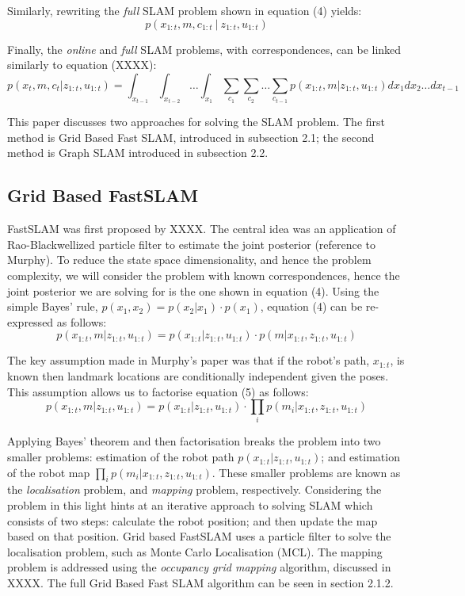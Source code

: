 \documentclass[a4paper]{article}
\begin{document}
Similarly, rewriting the \textit{full} SLAM problem shown in equation (4) yields:
\begin{equation}
p(x_{1:t}, m, c_{1:t} \ | \ z_{1:t}, u_{1:t})
\end{equation}

Finally, the \textit{online} and \textit{full} SLAM problems, with correspondences, can be linked similarly to equation (XXXX):
\begin{equation}
p(x_t, m, c_t | z_{1:t}, u_{1:t}) = \int_{x_{t-1}} \int_{x_{t-2}} \dots \int_{x_1} \sum_{c_1} \sum_{c_2} \dots \sum_{c_{t-1}} p(x_{1:t}, m | z_{1:t}, u_{1:t}) dx_1 dx_2 \dots dx_{t-1}
\end{equation}

This paper discusses two approaches for solving the SLAM problem. The first method is Grid Based Fast SLAM, introduced in subsection 2.1; the second method is Graph SLAM introduced in subsection 2.2.

\subsection{Grid Based FastSLAM}
FastSLAM was first proposed by XXXX. The central idea was an application of Rao-Blackwellized particle filter to estimate the joint posterior (reference to Murphy). To reduce the state space dimensionality, and hence the problem complexity, we will consider the problem with known correspondences, hence the joint posterior we are solving for is the one shown in equation (4). Using the simple Bayes' rule, $p(x_1,x_2) = p(x_2|x_1) \cdot p(x_1)$, equation (4) can be re-expressed as follows:
\begin{equation}
p(x_{1:t}, m | z_{1:t}, u_{1:t}) = p(x_{1:t} | z_{1:t}, u_{1:t}) \cdot p(m | x_{1:t}, z_{1:t}, u_{1:t})
\end{equation}

The key assumption made in Murphy's paper was that if the robot's path, $x_{1:t}$, is known then landmark locations are conditionally independent given the poses. This assumption allows us to factorise equation (5) as follows:
\begin{equation}
p(x_{1:t}, m | z_{1:t}, u_{1:t}) = p(x_{1:t} | z_{1:t}, u_{1:t}) \cdot \prod_{i} p(m_i | x_{1:t}, z_{1:t}, u_{1:t})
\end{equation}

Applying Bayes' theorem and then factorisation breaks the problem into two smaller problems: estimation of the robot path $p(x_{1:t} | z_{1:t}, u_{1:t})$; and estimation of the robot map $\prod_{i}p(m_i | x_{1:t}, z_{1:t}, u_{1:t})$. These smaller problems are known as the \textit{localisation} problem, and \textit{mapping} problem, respectively. Considering the problem in this light hints at an iterative approach to solving SLAM which consists of two steps: calculate the robot position; and then update the map based on that position. Grid based FastSLAM uses a particle filter to solve the localisation problem, such as Monte Carlo Localisation (MCL). The mapping problem is addressed using the \textit{occupancy grid mapping} algorithm, discussed in XXXX. The full Grid Based Fast SLAM algorithm can be seen in section 2.1.2.
\end{document}
